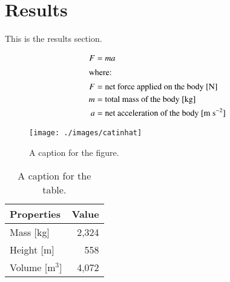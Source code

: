 \section{Results}

This is the results section.

\begin{align}
	F &= ma \\
	\intertext{where:}
	F &= \text{net force applied on the body [N]} \nonumber \\
	m &= \text{total mass of the body [kg]} \nonumber \\
	a &= \text{net acceleration of the body [m s}^{-2}\text{]} \nonumber
\end{align}

\begin{figure}[htbp!]
	\begin{center}
		\texttt{[image: ./images/catinhat]}
	\end{center}
	\caption{A caption for the figure.}
	\label{fig:catinhat}
\end{figure}

\begin{table}[ht]
	\centering
        \caption{A caption for the table.}
\begin{tabular}{lr}
	\hline
	\textbf{Properties} & \textbf{Value} \\
	\hline
    Mass [kg] & 2,324 \\
    Height [m] & 558 \\
    Volume [m$^3$] & 4,072 \\
    \hline
\end{tabular}
\label{tab:table1}
\end {table}
